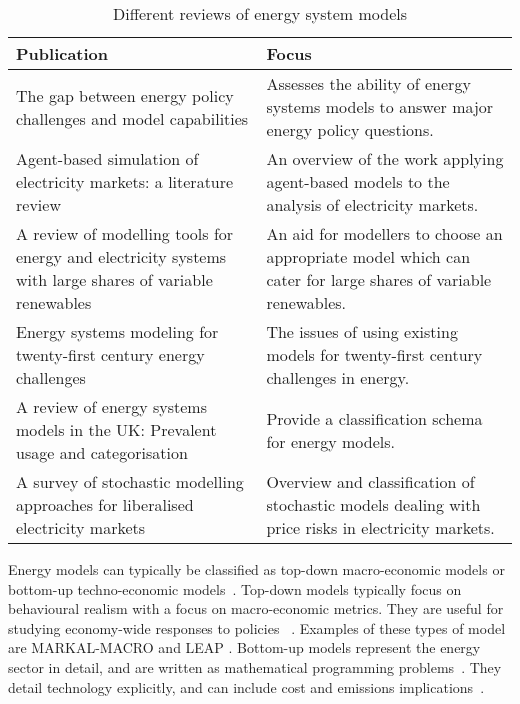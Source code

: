 \begin{table}[]
	\footnotesize
	\begin{tabular}{p{7.5cm}p{7.5cm}}
		\toprule
		Publication                                                                                                                 & Focus                                                                                                        \\ \midrule
		The gap between energy policy challenges and model capabilities \cite{Savvidis2019a}                                        & Assesses the ability of energy systems models to answer major energy policy questions.                       \\ \midrule
		Agent-based simulation of electricity markets: a literature review \cite{Sensfub2007}                                       & An overview of the work applying agent-based models to the analysis of electricity markets.                  \\ \midrule
		A review of modelling tools for energy and electricity systems with large shares of variable renewables \cite{Ringkjob2018} & An aid for modellers to choose an appropriate model which can cater for large shares of variable renewables. \\ \midrule
		Energy systems modeling for twenty-first century energy challenges \cite{Pfenninger2014b}                                   & The issues of using existing models for twenty-first century challenges in energy.                           \\ \midrule
		A review of energy systems models in the UK: Prevalent usage and categorisation \cite{Hall2016a}                            & Provide a classification schema for energy models.                                                           \\ \midrule
		A survey of stochastic modelling approaches for liberalised electricity markets \cite{Most2010}                             & Overview and classification of stochastic models dealing with price risks in electricity markets.            \\ \bottomrule
	\end{tabular}
	\caption{Different reviews of energy system models}
	\label{tab:litreview:reviews}
\end{table}



Energy models can typically be classified as top-down macro-economic models or bottom-up techno-economic models~\cite{Bohringer1998}. Top-down models typically focus on behavioural realism with a focus on macro-economic metrics. They are useful for studying economy-wide responses to policies ~\cite{Hall2016}. Examples of these types of model are MARKAL-MACRO \cite{Fishbone1981} and LEAP \cite{Heaps2016}. Bottom-up models represent the energy sector in detail, and are written as mathematical programming problems~\cite{Gargiulo2013}. They detail technology explicitly, and can include cost and emissions implications~\cite{Hall2016}.

